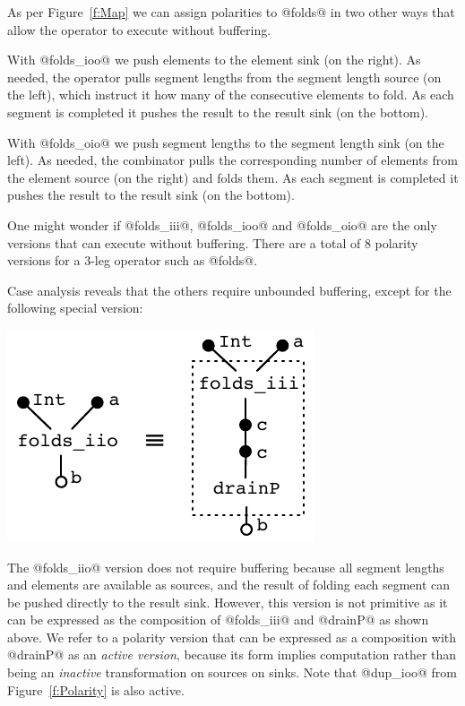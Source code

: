 As per Figure~\ref{f:Map} we can assign polarities to @folds@ in two other ways that allow the operator to execute without buffering. 

With @folds_ioo@ we push elements to the element sink (on the right). As needed, the operator pulls segment lengths from the segment length source (on the left), which instruct it how many of the consecutive elements to fold. As each segment is completed it pushes the result to the result sink (on the bottom).

With @folds_oio@ we push segment lengths to the segment length sink (on the left). As needed, the combinator pulls the corresponding number of elements from the element source (on the right) and folds them. As each segment is completed it pushes the result to the result sink (on the bottom). 

One might wonder if @folds_iii@, @folds_ioo@ and @folds_oio@ are the only versions that can execute without buffering. There are a total of 8 polarity versions for a 3-leg operator such as @folds@.

\eject
Case analysis reveals that the others require unbounded buffering, except for the following special version:
\begin{center}
\includegraphics[scale=0.8]{figures/folds-drain.pdf}
\end{center}

The @folds_iio@ version does not require buffering because all segment lengths and elements are available as sources, and the result of folding each segment can be pushed directly to the result sink. However, this version is not primitive as it can be expressed as the composition of @folds_iii@ and @drainP@ as shown above. We refer to a polarity version that can be expressed as a composition with @drainP@ as an \emph{active version}, because its form implies computation rather than being an \emph{inactive} transformation on sources on sinks. Note that @dup_ioo@ from Figure~\ref{f:Polarity} is also active.

